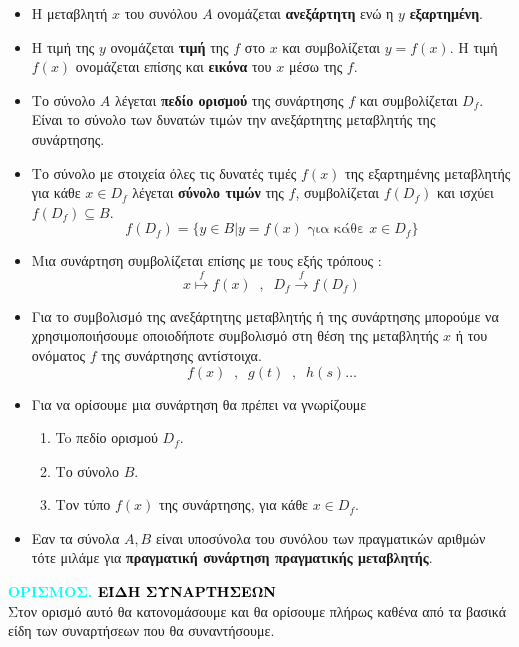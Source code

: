 \documentclass[twoside,10pt]{book}
\newcounter{orismos}[chapter]
\renewcommand{\theorismos}{\thechapter.\arabic{orismos}}
\newcommand{\Orismos}[1]{\refstepcounter{orismos}\textcolor{cyan}{\textbf{ΟΡΙΣΜΟΣ\hspace{2mm}\theorismos\hspace{1mm} \textcolor{black}{\MakeUppercase{#1}}}}\\}{}
\begin{document}
\begin{itemize}[itemsep=0mm]
\item Η μεταβλητή $ x $ του συνόλου $ Α $ ονομάζεται \textbf{ανεξάρτητη} ενώ η $ y $ \textbf{εξαρτημένη}.
\item Η τιμή της $ y $ ονομάζεται \textbf{τιμή} της $ f $ στο $ x $ και συμβολίζεται $ y=f(x) $. Η τιμή $ f(x) $ ονομάζεται επίσης και \textbf{εικόνα} του $ x $ μέσω της $ f $.
\item Το σύνολο $ Α $ λέγεται \textbf{πεδίο ορισμού} της συνάρτησης $ f $ και συμβολίζεται $ D_f $. Είναι το σύνολο των δυνατών τιμών την ανεξάρτητης μεταβλητής της συνάρτησης.
\item Το σύνολο με στοιχεία όλες τις δυνατές τιμές $ f(x) $ της εξαρτημένης μεταβλητής για κάθε $ x\in D_f $ λέγεται \textbf{σύνολο τιμών} της $ f $, συμβολίζεται $ f\left(D_f\right) $ και ισχύει $ f\left(D_f\right)\subseteq B $.
\[ f\left(D_f\right)=\{y\in B|y=f(x)\textrm{ για κάθε } x\in D_f\} \]
\item Μια συνάρτηση συμβολίζεται επίσης με τους εξής τρόπους : \[ x\overset{f}{\mapsto}f(x)\;\;,\;\;D_f\overset{f}{\rightarrow}f\left(D_f\right) \]
\item Για το συμβολισμό της ανεξάρτητης μεταβλητής ή της συνάρτησης μπορούμε να χρησιμοποιήσουμε οποιοδήποτε συμβολισμό στη θέση της μεταβλητής $ x $ ή του ονόματος $ f $ της συνάρτησης αντίστοιχα. \[ f(x)\;\;,\;\;g(t)\;\;,\;\;h(s)\ldots \]
\vspace{-3mm}
\item Για να ορίσουμε μια συνάρτηση θα πρέπει να γνωρίζουμε
\vspace{-3mm}
\begin{enumerate}[itemsep=0mm]
\item To πεδίο ορισμού $ D_f $.
\item Το σύνολο $ Β $.
\item Τον τύπο $ f(x) $ της συνάρτησης, για κάθε $ x\in D_f $.
\end{enumerate}
\item Εαν τα σύνολα $ A,B $ είναι υποσύνολα του συνόλου των πραγματικών αριθμών τότε μιλάμε για \textbf{πραγματική συνάρτηση πραγματικής μεταβλητής}.
\end{itemize}
\Orismos{Είδη συναρτήσεων}
Στον ορισμό αυτό θα κατονομάσουμε και θα ορίσουμε πλήρως καθένα από τα βασικά είδη των συναρτήσεων που θα συναντήσουμε.
\end{document}
